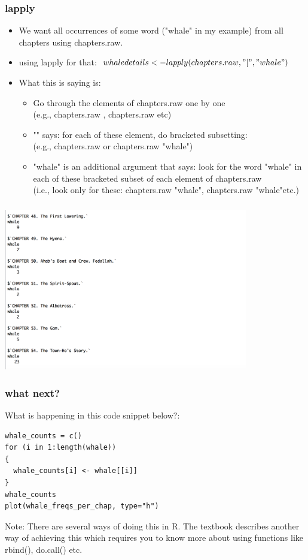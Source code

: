 \documentclass{beamer}
\begin{document}
\begin{frame}
\frametitle{lapply}
\begin{itemize}
\item We want all occurrences of some word ("whale" in my example) from all chapters using chapters.raw. \pause
\item using lapply for that: $whaledetails <- lapply(chapters.raw, "\lbrack", "whale")$
\item What this is saying is: 
\begin{itemize}
\item Go through the elements of chapters.raw one by one  \\ (e.g., chapters.raw \lbrack {}\rbrack \rbrack, chapters.raw \lbrack {}\rbrack \rbrack etc)
\pause \item "\lbrack" says: for each of these element, do bracketed subsetting: \\ (e.g., chapters.raw \lbrack {}\rbrack \rbrack {}\rbrack or chapters.raw \lbrack {}\rbrack \rbrack \lbrack "whale"\rbrack )
\item "whale" is an additional argument that says: look for the word "whale" in each of these bracketed subset of each element of chapters.raw
\\ (i.e., look only for these: chapters.raw \lbrack {}\rbrack \rbrack \lbrack "whale"\rbrack, chapters.raw \lbrack {}\rbrack \rbrack \lbrack "whale"\rbrack etc.)
\end{itemize}
\end{itemize}
\end{frame}

\begin{frame}
\frametitle{}
\includegraphics[width=0.8\textwidth]{whale.png}
\end{frame}

\begin{frame}[fragile]
\frametitle{what next?}
What is happening in this code snippet below?: 
\begin{verbatim}
whale_counts = c()
for (i in 1:length(whale))
{
  whale_counts[i] <- whale[[i]]
}
whale_counts
plot(whale_freqs_per_chap, type="h")
\end{verbatim}
\pause Note: There are several ways of doing this in R. The textbook describes another way of achieving this which requires you to know more about using functions like rbind(), do.call() etc. 
\end{frame}
\end{document}
